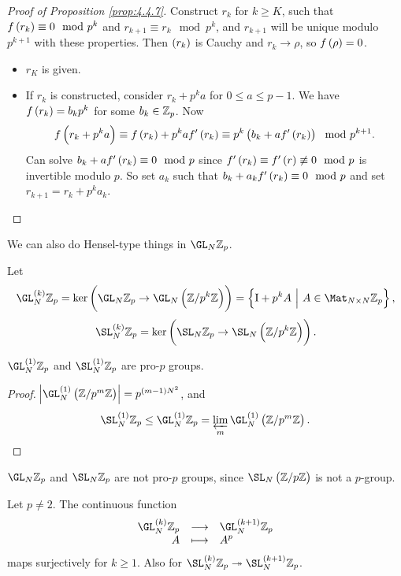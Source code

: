 \begin{proof}[Proof of Proposition \ref{prop:4.4.7}]
Construct $ r_k $ for $ k \ge K $, such that $ f\br{r_k} \equiv 0 \mod p^k $ and $ r_{k + 1} \equiv r_k \mod p^k $, and $ r_{k + 1} $ will be unique modulo $ p^{k + 1} $ with these properties. Then $ \br{r_k} $ is Cauchy and $ r_k \to \rho $, so $ f\br{\rho} = 0 $.
\begin{itemize}
\item $ r_K $ is given.
\item If $ r_k $ is constructed, consider $ r_k + p^ka $ for $ 0 \le a \le p - 1 $. We have $ f\br{r_k} = b_kp^k $ for some $ b_k \in \mathbb{Z}_p $. Now
$$ f\br{r_k + p^ka} \equiv f\br{r_k} + p^kaf'\br{r_k} \equiv p^k\br{b_k + af'\br{r_k}} \mod p^{k + 1}. $$
Can solve $ b_k + af'\br{r_k} \equiv 0 \mod p $ since $ f'\br{r_k} \equiv f'\br{r} \not\equiv 0 \mod p $ is invertible modulo $ p $. So set $ a_k $ such that $ b_k + a_kf'\br{r_k} \equiv 0 \mod p $ and set $ r_{k + 1} = r_k + p^ka_k $.
\end{itemize}
\end{proof}

\pagebreak

We can also do Hensel-type things in $ \GL_N \ZZ_p $.

\begin{definition}
Let
$$ \GL_N^{\br{k}} \ZZ_p = \ker \br{\GL_N \ZZ_p \to \GL_N \br{\ZZ / p^k\ZZ}} = \cbr{\I + p^kA \st A \in \Mat_{N \times N} \ZZ_p}, $$
$$ \SL_N^{\br{k}} \ZZ_p = \ker \br{\SL_N \ZZ_p \to \SL_N \br{\ZZ / p^k\ZZ}}. $$
\end{definition}

\begin{proposition}
$ \GL_N^{\br{1}} \ZZ_p $ and $ \SL_N^{\br{1}} \ZZ_p $ are pro-$ p $ groups.
\end{proposition}

\begin{proof}
$ \abs{\GL_N^{\br{1}} \br{\ZZ / p^m\ZZ}} = p^{\br{m - 1}N^2} $, and
$$ \SL_N^{\br{1}} \ZZ_p \le \GL_N^{\br{1}} \ZZ_p = \varprojlim_m \GL_N^{\br{1}} \br{\ZZ / p^m\ZZ}. $$
\end{proof}

\begin{remark}
$ \GL_N \ZZ_p $ and $ \SL_N \ZZ_p $ are not pro-$ p $ groups, since $ \SL_N \br{\ZZ / p\ZZ} $ is not a $ p $-group.
\end{remark}

\begin{proposition}
Let $ p \ne 2 $. The continuous function
$$ \function{\GL_N^{\br{k}} \ZZ_p}{\GL_N^{\br{k + 1}} \ZZ_p}{A}{A^p} $$
maps surjectively for $ k \ge 1 $. Also for $ \SL_N^{\br{k}} \ZZ_p \twoheadrightarrow \SL_N^{\br{k + 1}} \ZZ_p $.
\end{proposition}

